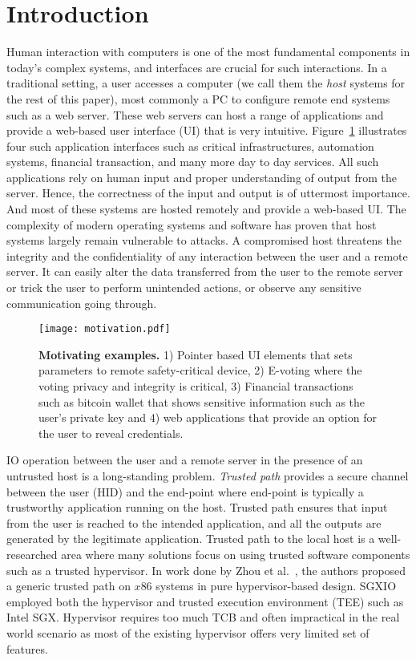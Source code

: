 \section{Introduction}
\label{sec:intro}

Human interaction with computers is one of the most fundamental components in today's complex systems, and interfaces are crucial for such interactions. In a traditional setting, a user accesses a computer (we call them the \emph{host} systems for the rest of this paper), most commonly a PC to configure remote end systems such as a web server. These web servers can host a range of applications and provide a web-based user interface (UI) that is very intuitive. Figure~\ref{fig:motivation} illustrates four such application interfaces such as critical infrastructures, automation systems, financial transaction, and many more day to day services. All such applications rely on human input and proper understanding of output from the server. Hence, the correctness of the input and output is of uttermost importance. And most of these systems are hosted remotely and provide a web-based UI. The complexity of modern operating systems and software has proven that host systems largely remain vulnerable to attacks. A compromised host threatens the integrity and the confidentiality of any interaction between the user and a remote server. It can easily alter the data transferred from the user to the remote server or trick the user to perform unintended actions, or observe any sensitive communication going through.

\begin{figure}[t]
\centering
\texttt{[image: motivation.pdf]}
\caption{\textbf{Motivating examples.} 1) Pointer based UI elements that sets parameters to remote safety-critical device, 2) E-voting where the voting privacy and integrity is critical, 3) Financial transactions such as bitcoin wallet that shows sensitive information such as the user's private key and 4) web applications that provide an option for the user to reveal credentials.}
\spacesave
\label{fig:motivation}
\centering
\end{figure}


IO operation between the user and a remote server in the presence of an untrusted host is a long-standing problem. \emph{Trusted path} provides a secure channel between the user (HID) and the end-point where end-point is typically a trustworthy application running on the host. Trusted path ensures that input from the user is reached to the intended application, and all the outputs are generated by the legitimate application. Trusted path to the local host is a well-researched area where many solutions focus on using trusted software components such as a trusted hypervisor. In work done by Zhou et al.~\cite{zhou2012building}, the authors proposed a generic trusted path on $x86$ systems in pure hypervisor-based design. SGXIO~\cite{weiser2017sgxio} employed both the hypervisor and trusted execution environment (TEE) such as Intel SGX. Hypervisor requires too much TCB and often impractical in the real world scenario as most of the existing hypervisor offers very limited set of features.

